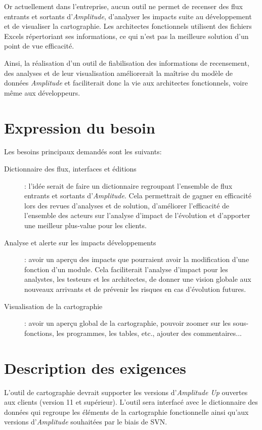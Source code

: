 \documentclass{polytech/polytech}
\begin{document}
Or actuellement dans l'entreprise, aucun outil ne permet de recenser des flux entrants et sortants d'\textit{Amplitude}, d'analyser les impacts suite au développement et de visualiser la cartographie. Les architectes fonctionnels utilisent des fichiers Excels répertoriant ses informations, ce qui n'est pas la meilleure solution d'un point de vue efficacité.

Ainsi, la réalisation d’un outil de fiabilisation des informations de recensement, des analyses et de leur visualisation améliorerait la maîtrise du modèle de données \textit{Amplitude} et faciliterait donc la vie aux architectes fonctionnels, voire même aux développeurs.


\section{Expression du besoin}

Les besoins principaux demandés sont les suivants:

\begin{description}
	\item[Dictionnaire des flux, interfaces et éditions] : l'idée serait de faire un dictionnaire regroupant l'ensemble de flux entrants et sortants d'\textit{Amplitude}. Cela permettrait de gagner en efficacité lors des revues d'analyses et de solution, d'améliorer l'efficacité de l'ensemble des acteurs sur l'analyse d'impact de l'évolution et d'apporter une meilleur plus-value pour les clients.
	\item[Analyse et alerte sur les impacts développements] : avoir un aperçu des impacts que pourraient avoir la modification d'une fonction d'un module. Cela faciliterait l'analyse d'impact pour les analystes, les testeurs et les architectes, de donner une vision globale aux nouveaux arrivants et de prévenir les risques en cas d'évolution futures.
	\item[Visualisation de la cartographie] : avoir un aperçu global de la cartographie, pouvoir zoomer sur les sous-fonctions, les programmes, les tables, etc., ajouter des commentaires...
\end{description}


\section{Description des exigences}

L'outil de cartographie devrait supporter les versions d'\textit{Amplitude Up} ouvertes aux clients (version 11 et supérieur). L'outil sera interfacé avec le dictionnaire des données qui regroupe les éléments de la cartographie fonctionnelle ainsi qu'aux versions d'\textit{Amplitude} souhaitées par le biais de SVN. 
\end{document}
